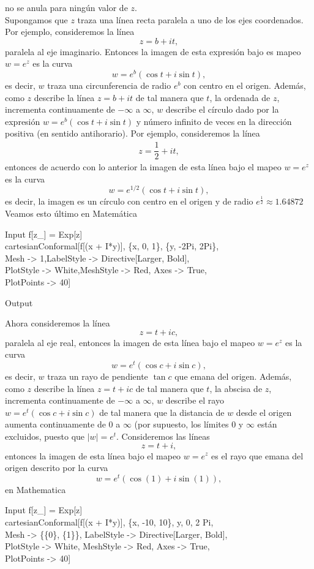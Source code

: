 no se anula para ningún valor de $z$.\\
Supongamos que $z$ traza una línea recta paralela a uno de los ejes coordenados. Por ejemplo, consideremos la línea
$$z=b+it,$$
paralela al eje imaginario. Entonces la imagen de esta expresión bajo es mapeo $w=e^z$ es la curva
$$w=e^b(\cos t+i\sin t),$$ 
es decir, $w$ traza una circunferencia de radio $e^b$ con centro en el origen. Además, como $z$ describe la línea $z=b+it$ de tal manera que $t$, la ordenada de $z$, incrementa continuamente de $-\infty$ a $\infty$, $w$ describe el círculo dado por la expresión  $w=e^b(\cos t+i\sin t)$ y número infinito de veces en la dirección positiva (en sentido antihorario). Por ejemplo, consideremos la línea
\[
	\begin{array}{c}
		z=\dfrac{1}{2}+it,
	\end{array}
\]
entonces de acuerdo con lo anterior la imagen de esta línea bajo el mapeo $w=e^z$ es la curva
$$w=e^{1/2}(\cos t+i\sin t),$$
es decir, la imagen es un círculo con centro en el origen y de radio $e^{\frac{1}{2}}\approx1.64872$
Veamos esto último en Matemática 
\begin{mmaCell}{Input}
	 f[z_] = Exp[z] \\cartesianConformal[f[(x + I*y)], \{x, 0, 1\}, \{y, -2Pi, 2Pi\},\\Mesh -> 1,LabelStyle -> Directive[Larger, Bold],\\PlotStyle -> White,MeshStyle -> Red, Axes -> True,\\PlotPoints -> 40]
\end{mmaCell}
\begin{mmaCell}[moregraphics={moreig={scale=0.5}}]{Output}
\end{mmaCell}
Ahora consideremos la línea 
$$z=t+ic,$$
paralela al eje real, entonces la imagen de esta línea bajo el mapeo $w=e^z$ es la curva
$$w=e^t(\cos c+i\sin c),$$
es decir, $w$ traza un rayo de pendiente $\tan c$ que emana del origen. Además, como $z$ describe la línea $z=t+ic$ de tal manera que $t$, la abscisa de $z$,  incrementa continuamente de $-\infty$ a $\infty$, $w$ describe el rayo $w=e^t(\cos c+i\sin c)$ de tal manera que la distancia de $w$ desde el origen aumenta continuamente
de $0$ a $\infty$ (por supuesto, los límites $0$ y $\infty$ están excluidos, puesto que $|w|=e^t$. Consideremos las líneas 
$$z=t+i,$$
 entonces la imagen de esta línea bajo el mapeo $w=e^z$ es el rayo que emana del origen descrito por la curva
$$w=e^t(\cos(1)+i\sin(1)),$$ 
en Mathematica 
\begin{mmaCell}{Input}
	 f[z_] = Exp[z] \\cartesianConformal[f[(x + I*y)], \{x, -10, 10\}, {y, 0, 2 Pi},\\Mesh -> \{\{0\}, \{1\}\}, LabelStyle -> Directive[Larger, Bold],\\PlotStyle -> White, MeshStyle -> Red, Axes -> True,\\PlotPoints -> 40]
\end{mmaCell}
